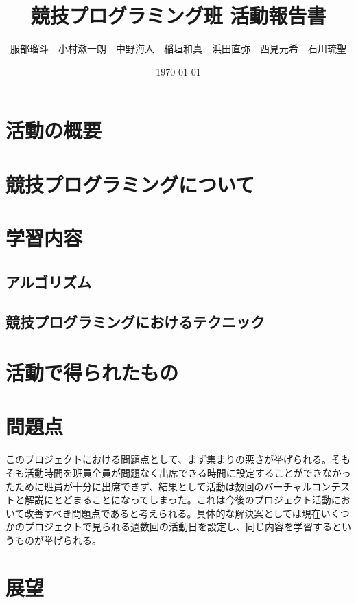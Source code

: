 \documentclass[11pt,a4paper]{jsarticle}
\title{競技プログラミング班 活動報告書}
\author{服部瑠斗　小村漱一朗　中野海人　稲垣和真　浜田直弥　西見元希　石川琉聖}
\date{\today}
\begin{document}
\maketitle
%
%
\section{活動の概要}
\section{競技プログラミングについて}
\section{学習内容}
\subsection{アルゴリズム}
\subsection{競技プログラミングにおけるテクニック}
\section{活動で得られたもの}
\section{問題点}
  このプロジェクトにおける問題点として、まず集まりの悪さが挙げられる。そもそも活動時間を班員全員が問題なく出席できる時間に設定することができなかったために班員が十分に出席できず、結果として活動は数回のバーチャルコンテストと解説にとどまることになってしまった。これは今後のプロジェクト活動において改善すべき問題点であると考えられる。具体的な解決案としては現在いくつかのプロジェクトで見られる週数回の活動日を設定し、同じ内容を学習するというものが挙げられる。
\section{展望}

%
%
\end{document}
